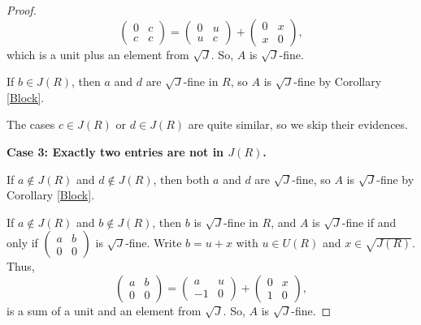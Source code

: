 \documentclass[12pt]{amsart}
\theoremstyle{definition}
\begin{document}
\begin{proof}
	\[
	\begin{pmatrix} 0 & c \\ c & c \end{pmatrix}
	= \begin{pmatrix} 0 & u \\ u & c \end{pmatrix} + \begin{pmatrix} 0 & x \\ x & 0 \end{pmatrix},
	\]
which is a unit plus an element from $\sqrt{J}$. So, \( A \) is $\sqrt{J}$-fine.
	
If \( b \in J(R) \), then \( a \) and \( d \) are $\sqrt{J}$-fine in \( R \), so \( A \) is $\sqrt{J}$-fine by Corollary \ref{Block}.
	
The cases \( c \in J(R) \) or \( d \in J(R) \) are quite similar, so we skip their evidences.

\medskip
	
\textbf{Case 3: Exactly two entries are not in \( J(R) \).}

\medskip
	
If \( a \not\in J(R) \) and \( d \not\in J(R) \), then both \( a \) and \( d \) are $\sqrt{J}$-fine, so \( A \) is $\sqrt{J}$-fine by Corollary \ref{Block}.
	
If \( a \not\in J(R) \) and \( b \not\in J(R) \), then \( b \) is $\sqrt{J}$-fine in \( R \), and \( A \) is $\sqrt{J}$-fine if and only if \( \begin{pmatrix} a & b \\ 0 & 0 \end{pmatrix} \) is $\sqrt{J}$-fine. Write \( b = u + x \) with \( u \in U(R) \) and \( x \in \sqrt{J(R)} \). Thus,
	\[
	\begin{pmatrix} a & b \\ 0 & 0 \end{pmatrix}
	= \begin{pmatrix} a & u \\ -1 & 0 \end{pmatrix} + \begin{pmatrix} 0 & x \\ 1 & 0 \end{pmatrix},
	\]
is a sum of a unit and an element from $\sqrt{J}$. So, \( A \) is $\sqrt{J}$-fine.
	

\end{proof}
\end{document}
